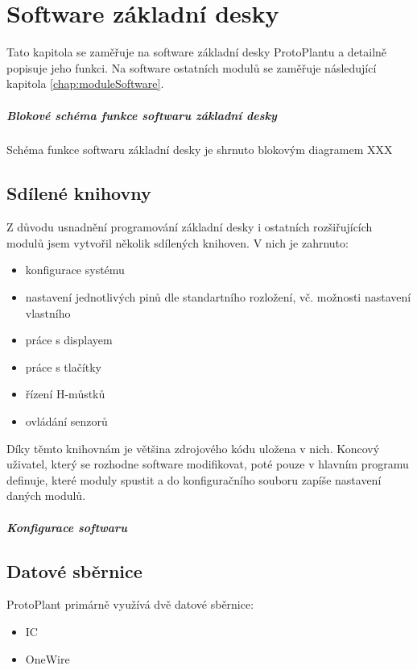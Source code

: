 \chapter{Software základní desky}
Tato kapitola se zaměřuje na software základní desky ProtoPlantu a detailně popisuje jeho funkci.
Na software ostatních modulů se zaměřuje následující kapitola \ref{chap:moduleSoftware}.

\paragraph{Blokové schéma funkce softwaru základní desky}
Schéma funkce softwaru základní desky je shrnuto blokovým diagramem XXX

\section{Sdílené knihovny}
Z důvodu usnadnění programování základní desky i ostatních rozšiřujících modulů jsem vytvořil několik sdílených knihoven. 
V nich je zahrnuto:
\begin{itemize}
    \item konfigurace systému
    \item nastavení jednotlivých pinů dle standartního rozložení, vč. možnosti nastavení vlastního
    \item práce s displayem
    \item práce s tlačítky
    \item řízení H-můstků
    \item ovládání senzorů
\end{itemize}
Díky těmto knihovnám je většina zdrojového kódu uložena v nich. 
Koncový uživatel, který se rozhodne software modifikovat, poté pouze v hlavním programu definuje, které moduly spustit a do konfiguračního souboru zapíše nastavení daných modulů.

\paragraph{Konfigurace softwaru}

\section{Datové sběrnice}
ProtoPlant primárně využívá dvě datové sběrnice:
\begin{itemize}
    \item IC
    \item OneWire
\end{itemize}

